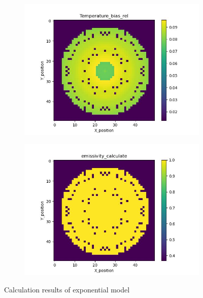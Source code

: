 \begin{figure}[htbp]
\begin{minipage}{\textwidth}
\begin{subfigure}{0.49\textwidth}
        \end{subfigure}
    \end{minipage}\\
    \begin{minipage}{\textwidth}
        \centering
        \begin{subfigure}{0.49\textwidth}
            \centering
            \includegraphics[width=\textwidth]{figures/raw_data/5/exp/T_bias.jpg}
        \end{subfigure}
        \begin{subfigure}{0.49\textwidth}
            \centering
            \includegraphics[width=\textwidth]{figures/raw_data/5/exp/emi_cal.jpg}
        \end{subfigure}
    \end{minipage}
    \caption{Calculation results of exponential model}
    \label{fig: result_exponential_model}
\end{figure}

